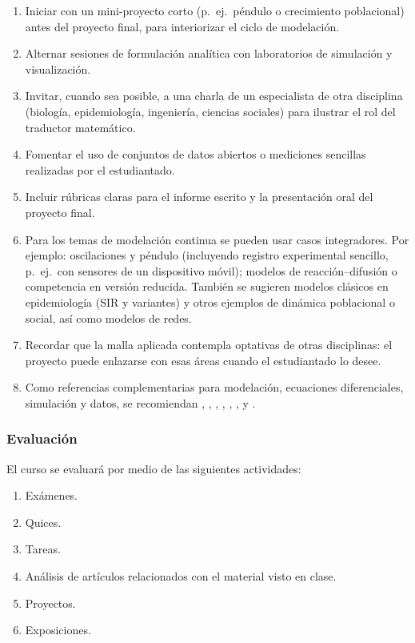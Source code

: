\begin{refsection}
\begin{enumerate}
    \item Iniciar con un mini-proyecto corto (p.\ ej.\ péndulo o crecimiento poblacional) antes del proyecto final, para interiorizar el ciclo de modelación.
    \item Alternar sesiones de formulación analítica con laboratorios de simulación y visualización.
    \item Invitar, cuando sea posible, a una charla de un especialista de otra disciplina (biología, epidemiología, ingeniería, ciencias sociales) para ilustrar el rol del traductor matemático.
    \item Fomentar el uso de conjuntos de datos abiertos o mediciones sencillas realizadas por el estudiantado.
    \item Incluir rúbricas claras para el informe escrito y la presentación oral del proyecto final.
    \item Para los temas de modelación continua se pueden usar casos integradores. Por ejemplo: oscilaciones y péndulo (incluyendo registro experimental sencillo, p.\ ej.\ con sensores de un dispositivo móvil); modelos de reacción--difusión o competencia en versión reducida. También se sugieren modelos clásicos en epidemiología (SIR y variantes) y otros ejemplos de dinámica poblacional o social, así como modelos de redes.
    \item Recordar que la malla aplicada contempla optativas de otras disciplinas: el proyecto puede enlazarse con esas áreas cuando el estudiantado lo desee.
    \item Como referencias complementarias para modelación, ecuaciones diferenciales, simulación y datos, se recomiendan \cite{BoyDP02}, \cite{Bra93}, \cite{Kot01}, \cite{Kutz13}, \cite{Per01}, \cite{Ros06}, \cite{Sal08} y \cite{Sch15}.
\end{enumerate}

\subsubsection*{Evaluación}

El curso se evaluará por medio de las siguientes actividades:

\begin{enumerate}
\item Exámenes.
\item Quices.
\item Tareas.
\item Análisis de artículos relacionados con el material visto en clase.
\item Proyectos.
\item Exposiciones.
\end{enumerate}

\nocite{Ben78}
\nocite{Bra93}
\nocite{BoyDP02}
\nocite{Cod89}
\nocite{Eck17}
\nocite{Kot01}
\nocite{Kutz13}
\nocite{Mag23}
\nocite{Per01}
\nocite{Pol14}
\nocite{Ros06}
\nocite{Sal08}
\nocite{Sch15}
\nocite{Stro2024}
\nocite{VE21}

\printcursosbibliography
\end{refsection}
